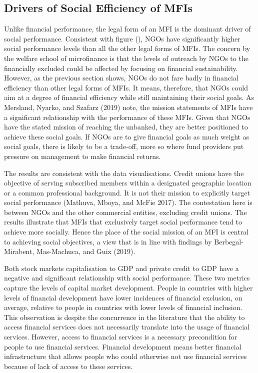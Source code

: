 \documentclass[
]{article}
\begin{document}
\newpage

\hypertarget{drivers-of-social-efficiency-of-mfis}{%
\subsection{Drivers of Social Efficiency of
MFIs}\label{drivers-of-social-efficiency-of-mfis}}

Unlike financial performance, the legal form of an MFI is the dominant
driver of social performance. Consistent with figure (), NGOs have
significantly higher social performance levels than all the other legal
forms of MFIs. The concern by the welfare school of microfinance is that
the levels of outreach by NGOs to the financially excluded could be
affected by focusing on financial sustainability. However, as the
previous section shows, NGOs do not fare badly in financial efficiency
than other legal forms of MFIs. It means, therefore, that NGOs could aim
at a degree of financial efficiency while still maintaining their social
goals. As Mersland, Nyarko, and Szafarz (2019) note, the mission
statements of MFIs have a significant relationship with the performance
of these MFIs. Given that NGOs have the stated mission of reaching the
unbanked, they are better positioned to achieve these social goals. If
NGOs are to give financial goals as much weight as social goals, there
is likely to be a trade-off, more so where fund providers put pressure
on management to make financial returns.

The results are consistent with the data visualisations. Credit unions
have the objective of serving subscribed members within a designated
geographic location or a common professional background. It is not their
mission to explicitly target social performance (Mathuva, Mboya, and
McFie 2017). The contestation here is between NGOs and the other
commercial entities, excluding credit unions. The results illustrate
that MFIs that exclusively target social performance tend to achieve
more socially. Hence the place of the social mission of an MFI is
central to achieving social objectives, a view that is in line with
findings by Berbegal-Mirabent, Mas-Machuca, and Guix (2019).

Both stock markets capitalisation to GDP and private credit to GDP have
a negative and significant relationship with social performance. These
two metrics capture the levels of capital market development. People in
countries with higher levels of financial development have lower
incidences of financial exclusion, on average, relative to people in
countries with lower levels of financial inclusion. This observation is
despite the concurrence in the literature that the ability to access
financial services does not necessarily translate into the usage of
financial services. However, access to financial services is a necessary
precondition for people to use financial services. Financial development
means better financial infrastructure that allows people who could
otherwise not use financial services because of lack of access to these
services.
\end{document}
